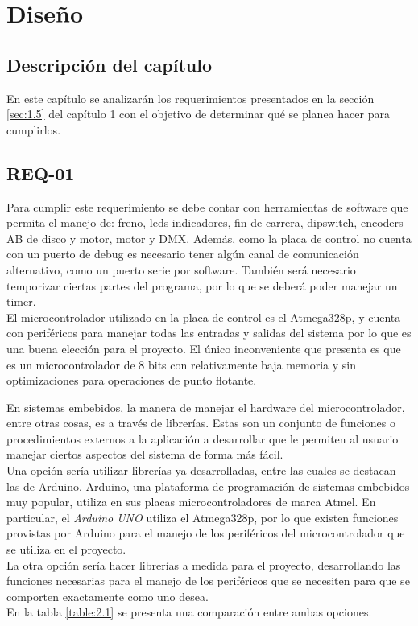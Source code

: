 \chapter{Diseño}
\thispagestyle{empty}

\section{Descripción del capítulo} \label{sec:\thesection}
En este capítulo se analizarán los requerimientos presentados en la sección \ref{sec:1.5} del capítulo 1 con el objetivo de determinar qué se planea hacer para cumplirlos.

\section{REQ-01} \label{sec:\thesection}
Para cumplir este requerimiento se debe contar con herramientas de software que permita el manejo de: freno, leds indicadores, fin de carrera, dipswitch, encoders AB de disco y motor, motor y DMX. Además, como la placa de control no cuenta con un puerto de debug es necesario tener algún canal de comunicación alternativo, como un puerto serie por software. También será necesario temporizar ciertas partes del programa, por lo que se deberá poder manejar un timer.\\
El microcontrolador utilizado en la placa de control es el Atmega328p, y cuenta con periféricos para manejar todas las entradas y salidas del sistema por lo que es una buena elección para el proyecto. El único inconveniente que presenta es que es un microcontrolador de 8 bits con relativamente baja memoria y sin optimizaciones para operaciones de punto flotante. 

En sistemas embebidos, la manera de manejar el hardware del microcontrolador, entre otras cosas, es a través de librerías. Estas son un conjunto de funciones o procedimientos externos a la aplicación a desarrollar que le permiten al usuario manejar ciertos aspectos del sistema de forma más fácil.\\
Una opción sería utilizar librerías ya desarrolladas, entre las cuales se destacan las de Arduino. Arduino, una plataforma de programación de sistemas embebidos muy popular, utiliza en sus placas microcontroladores de marca Atmel. En particular, el \textit{Arduino UNO} utiliza el Atmega328p, por lo que existen funciones provistas por Arduino para el manejo de los periféricos del microcontrolador que se utiliza en el proyecto. \\
La otra opción sería hacer librerías a medida para el proyecto, desarrollando las funciones necesarias para el manejo de los periféricos que se necesiten para que se comporten exactamente como uno desea.\\
En la tabla \ref{table:2.1} se presenta una comparación entre ambas opciones.

